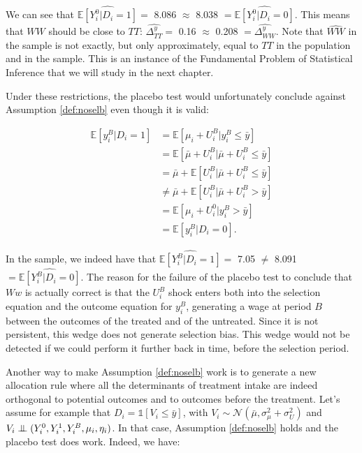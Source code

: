\documentclass[]{book}
\newcommand{\uns}[1]{\mathds{1}[ #1 ]}
\newcommand{\esp}[1]{\mathbb{E}[ #1 ]}
\newcommand\Ind{\protect\mathpalette{\protect\independenT}{\perp}}
\def\independenT#1#2{\mathrel{\setbox0\hbox{$#1#2$}\copy0\kern-\wd0\mkern4mu\box0}}
\theoremstyle{definition}
\theoremstyle{definition}
\theoremstyle{definition}
\theoremstyle{remark}
\begin{document}
We can see that \(\hat{\esp{Y_i^0|D_i=1}}=\) 8.086 \(\approx\) 8.038
\(=\hat{\esp{Y_i^0|D_i=0}}\). This means that \(WW\) should be close to
\(TT\): \(\hat{\Delta^y_{TT}}=\) 0.16 \(\approx\) 0.208
\(=\hat{\Delta^y_{WW}}\). Note that \(\hat{WW}\) in the sample is not
exactly, but only approximately, equal to \(TT\) in the population and
in the sample. This is an instance of the Fundamental Problem of
Statistical Inference that we will study in the next chapter.

Under these restrictions, the placebo test would unfortunately conclude
against Assumption \ref{def:noselb} even though it is valid:

\begin{align*}
\esp{y_i^B|D_i=1} & = \esp{\mu_i+ U_i^B|y_i^B\leq\bar{y}}\\
                  & = \esp{\bar{\mu}+U_i^B|\bar{\mu}+U_i^B\leq\bar{y}}\\
                  & = \bar{\mu}  + \esp{U_i^B|\bar{\mu}+U_i^B\leq\bar{y}}\\
                  & \neq \bar{\mu}  + \esp{U_i^B|\bar{\mu}+U_i^B>\bar{y}}\\
                  & = \esp{\mu_i+U_i^0|y_i^B>\bar{y}}\\
                  & = \esp{y_i^B|D_i=0}.                  
\end{align*}

In the sample, we indeed have that \(\hat{\esp{Y_i^B|D_i=1}}=\) 7.05
\(\neq\) 8.091 \(=\hat{\esp{Y_i^B|D_i=0}}\). The reason for the failure
of the placebo test to conclude that \(Ww\) is actually correct is that
the \(U_i^B\) shock enters both into the selection equation and the
outcome equation for \(y_i^B\), generating a wage at period \(B\)
between the outcomes of the treated and of the untreated. Since it is
not persistent, this wedge does not generate selection bias. This wedge
would not be detected if we could perform it further back in time,
before the selection period.

Another way to make Assumption \ref{def:noselb} work is to generate a
new allocation rule where all the determinants of treatment intake are
indeed orthogonal to potential outcomes and to outcomes before the
treatment. Let's assume for example that \(D_i=\uns{V_i\leq\bar{y}}\),
with \(V_i\sim\mathcal{N}(\bar{\mu},\sigma^2_{\mu}+\sigma^2_{U})\) and
\(V_i\Ind(Y_i^0,Y_i^1,Y_i^B,\mu_i,\eta_i)\). In that case, Assumption
\ref{def:noselb} holds and the placebo test does work. Indeed, we have:
\end{document}
